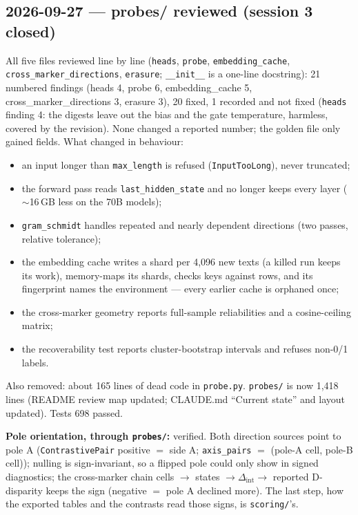 \documentclass{article}
\begin{document}
\subsection*{2026-09-27 --- probes/ reviewed (session 3 closed)}
All five files reviewed line by line (\texttt{heads}, \texttt{probe}, \texttt{embedding\_cache},
\texttt{cross\_marker\_directions}, \texttt{erasure}; \texttt{\_\_init\_\_} is a one-line docstring): 21 numbered
findings (heads 4, probe 6, embedding\_cache 5, cross\_marker\_directions 3, erasure 3), 20 fixed, 1 recorded and
not fixed (\texttt{heads} finding 4: the digests leave out the bias and the gate temperature, harmless, covered by
the revision). None changed a reported number; the golden file only gained fields. What changed in behaviour:
\begin{itemize}
  \item an input longer than \texttt{max\_length} is refused (\texttt{InputTooLong}), never truncated;
  \item the forward pass reads \texttt{last\_hidden\_state} and no longer keeps every layer ($\sim$16\,GB less on
        the 70B models);
  \item \texttt{gram\_schmidt} handles repeated and nearly dependent directions (two passes, relative tolerance);
  \item the embedding cache writes a shard per 4{,}096 new texts (a killed run keeps its work), memory-maps its
        shards, checks keys against rows, and its fingerprint names the environment --- every earlier cache is
        orphaned once;
  \item the cross-marker geometry reports full-sample reliabilities and a cosine-ceiling matrix;
  \item the recoverability test reports cluster-bootstrap intervals and refuses non-0/1 labels.
\end{itemize}
Also removed: about 165 lines of dead code in \texttt{probe.py}. \texttt{probes/} is now 1{,}418 lines (README
review map updated; CLAUDE.md ``Current state'' and layout updated). Tests 698 passed.

\textbf{Pole orientation, through \texttt{probes/}:} verified. Both direction sources point to pole A
(\texttt{ContrastivePair} positive $=$ side A; \texttt{axis\_pairs} $=$ (pole-A cell, pole-B cell)); nulling is
sign-invariant, so a flipped pole could only show in signed diagnostics; the cross-marker chain cells $\to$ states
$\to\Delta_{\text{int}}\to$ reported D-disparity keeps the sign (negative $=$ pole A declined more). The last step,
how the exported tables and the contrasts read those signs, is \texttt{scoring/}'s.
\end{document}
